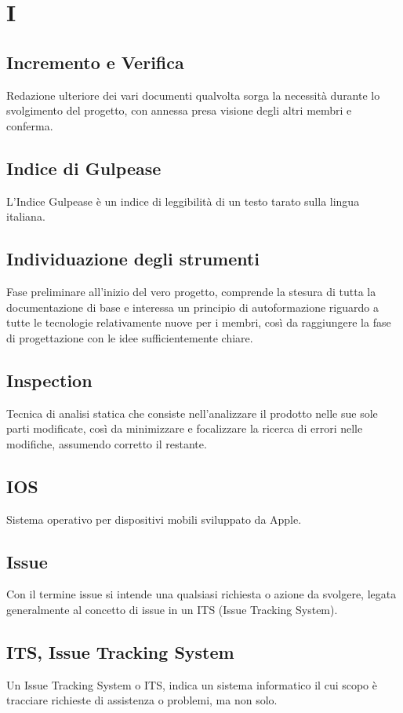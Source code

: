 \section{I}
	\subsection{Incremento e Verifica}
		Redazione ulteriore dei vari documenti qualvolta sorga la necessità durante lo svolgimento del progetto, con annessa presa visione degli altri membri e conferma.
	\subsection{Indice di Gulpease}
		L'Indice Gulpease è un indice di leggibilità di un testo tarato sulla lingua italiana.
	\subsection{Individuazione degli strumenti}
		Fase preliminare all'inizio del vero progetto, comprende la stesura di tutta la documentazione di base e interessa un principio di autoformazione riguardo a tutte le tecnologie relativamente nuove per i membri, così da raggiungere la fase di progettazione con le idee sufficientemente chiare.
	\subsection{Inspection} 
		Tecnica di analisi statica che consiste nell'analizzare il prodotto nelle sue sole parti modificate, così da minimizzare e focalizzare la ricerca di errori nelle modifiche, assumendo corretto il restante.
	\subsection{IOS}
	    Sistema operativo per dispositivi mobili sviluppato da Apple.
	\subsection{Issue}  
		Con il termine issue si intende una qualsiasi richiesta o azione da svolgere, legata generalmente al concetto di issue in un ITS (Issue Tracking System).
	\subsection{ITS, Issue Tracking System}  
		Un Issue Tracking System o ITS, indica un sistema informatico il cui scopo è tracciare richieste di assistenza o problemi, ma non solo.
	
\newpage